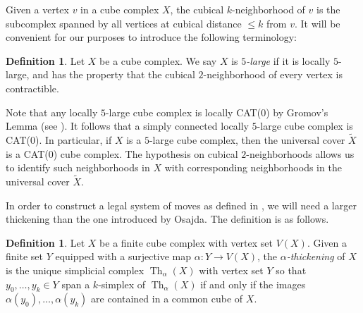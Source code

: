 \documentclass[12pt, letterpaper]{article}
\newcommand{\Th}{\operatorname{Th}}
\theoremstyle{plain}
\theoremstyle{definition}
\newtheorem{defn}[thm]{Definition}
\begin{document}

Given a vertex $v$ in a cube complex $X$, the cubical $k$-neighborhood of $v$ is the subcomplex spanned by all vertices at cubical distance $\leq k$ from $v$. It will be convenient for our purposes to introduce the following terminology:

\begin{defn}
    Let $X$ be a cube complex. We say $X$ is \emph{$5$-large} if it is locally $5$-large, and has the property that the cubical $2$-neighborhood of every vertex is contractible. 
\end{defn}

Note that any locally $5$-large cube complex is locally CAT($0$) by Gromov's Lemma (see \cite[App.\ I]{Davis}). It follows that a simply connected locally $5$-large cube complex is CAT($0$). In particular, if $X$ is a $5$-large cube complex, then the universal cover $\tilde X$ is a CAT($0$) cube complex. The hypothesis on cubical $2$-neighborhoods allows us to identify such neighborhoods in $X$ with corresponding neighborhoods in the universal cover $\tilde X$.

In order to construct a legal system of moves as defined in , we will need a larger thickening than the one introduced by Osajda. The definition is as follows.  

\begin{defn}
    Let $X$ be a finite cube complex with vertex set $V(X)$. Given a finite set $Y$ equipped with a surjective map $\alpha \colon Y \to V(X)$, the \emph{$\alpha$-thickening} of $X$ is the unique simplicial complex $\Th_\alpha(X)$ with vertex set $Y$ so that $y_0, \dots, y_k \in Y$ span a $k$-simplex of $\Th_\alpha(X)$ if and only if the images ${\alpha(y_0), \dots, \alpha(y_k)}$ are contained in a common cube of $X$.
\end{defn}
\end{document}
